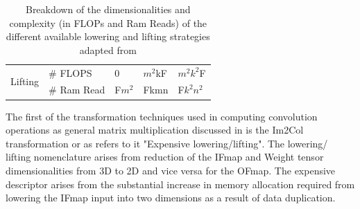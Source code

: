 \begin{table}[!ht]
\begin{tabular}{ll|l|l|l|}
    \multicolumn{1}{|l|}{\multirow{2}{*}{Lifting}}                                                    & \# FLOPS            & 0                                                                        & $m^2$kF                                                      & $m^2$$k^2$F                              \\ \cline{2-5} 
    \multicolumn{1}{|l|}{}                                                                            & \# Ram Read         & F$m^2$                                                                   & Fkmn                                                                        & F$k^2$$n^2$                              \\ \hline
    \end{tabular}
\label{Table:lowering_lifting_breakdown}
    \caption{Breakdown of the dimensionalities and complexity (in FLOPs and Ram Reads) of the different available lowering and lifting strategies adapted from \cite{cafe_con_troll}}
\end{table}

The first of the transformation techniques used in computing convolution
operations as general matrix multiplication discussed in \cite{cafe_con_troll}
is the Im2Col transformation or as \cite{cafe_con_troll} refers to it
"Expensive lowering/lifting". The lowering/ lifting nomenclature arises from
reduction of the IFmap and Weight tensor dimensionalities from 3D to 2D and vice
versa for the OFmap. The expensive descriptor arises from the substantial
increase in memory allocation required from lowering the IFmap input into two
dimensions as a result of data duplication. 

